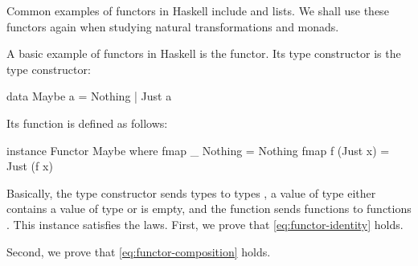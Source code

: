 Common examples of functors in Haskell include  and
lists. We shall use these functors again when studying natural
transformations and monads.

\begin{example}
  \label{ex:functor-maybe-haskell}


  A basic example of functors in Haskell is the 
  functor. Its type constructor is the  type
  constructor:
  \begin{codehaskell}
data Maybe a = Nothing | Just a
  \end{codehaskell}
  Its  function is defined as follows:
  \begin{codehaskell}
instance Functor Maybe where
  fmap _ Nothing  = Nothing
  fmap f (Just x) = Just (f x)
  \end{codehaskell}
  Basically, the  type constructor sends types
   to types , a value of type
   either contains a value of type
   or is empty, and the  function
  sends functions  to functions . This instance satisfies the laws. First, we prove
  that \eqref{eq:functor-identity} holds.

  \vspace{1em}
  \begin{steps}
  \end{steps}
  \begin{steps}
  \end{steps}
  Second, we prove that \eqref{eq:functor-composition} holds.

  \vspace{1em}
  \begin{steps}
  \end{steps}
  \begin{steps}
  \end{steps}

\end{example}

